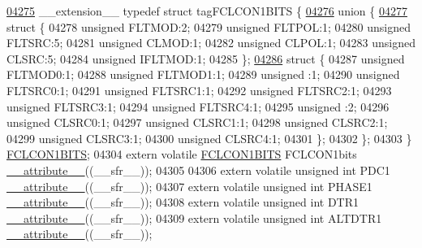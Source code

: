 \begin{DoxyCode}
\hypertarget{a00015_source_l04275}{}\hyperlink{a00014}{04275} \_\_extension\_\_ \textcolor{keyword}{typedef} \textcolor{keyword}{struct }tagFCLCON1BITS \{
\hypertarget{a00015_source_l04276}{}\hyperlink{a00015}{04276}   \textcolor{keyword}{union }\{
\hypertarget{a00015_source_l04277}{}\hyperlink{a00015}{04277}     \textcolor{keyword}{struct }\{
04278       \textcolor{keywordtype}{unsigned} FLTMOD:2;
04279       \textcolor{keywordtype}{unsigned} FLTPOL:1;
04280       \textcolor{keywordtype}{unsigned} FLTSRC:5;
04281       \textcolor{keywordtype}{unsigned} CLMOD:1;
04282       \textcolor{keywordtype}{unsigned} CLPOL:1;
04283       \textcolor{keywordtype}{unsigned} CLSRC:5;
04284       \textcolor{keywordtype}{unsigned} IFLTMOD:1;
04285     \};
\hypertarget{a00015_source_l04286}{}\hyperlink{a00015}{04286}     \textcolor{keyword}{struct }\{
04287       \textcolor{keywordtype}{unsigned} FLTMOD0:1;
04288       \textcolor{keywordtype}{unsigned} FLTMOD1:1;
04289       \textcolor{keywordtype}{unsigned} :1;
04290       \textcolor{keywordtype}{unsigned} FLTSRC0:1;
04291       \textcolor{keywordtype}{unsigned} FLTSRC1:1;
04292       \textcolor{keywordtype}{unsigned} FLTSRC2:1;
04293       \textcolor{keywordtype}{unsigned} FLTSRC3:1;
04294       \textcolor{keywordtype}{unsigned} FLTSRC4:1;
04295       \textcolor{keywordtype}{unsigned} :2;
04296       \textcolor{keywordtype}{unsigned} CLSRC0:1;
04297       \textcolor{keywordtype}{unsigned} CLSRC1:1;
04298       \textcolor{keywordtype}{unsigned} CLSRC2:1;
04299       \textcolor{keywordtype}{unsigned} CLSRC3:1;
04300       \textcolor{keywordtype}{unsigned} CLSRC4:1;
04301     \};
04302   \};
04303 \} \hyperlink{a00014_d0/dc4/a00443}{FCLCON1BITS};
04304 \textcolor{keyword}{extern} \textcolor{keyword}{volatile} \hyperlink{a00014_d0/dc4/a00443}{FCLCON1BITS} FCLCON1bits \hyperlink{a00015_a493c46f03454991ccc5aa7a6e1dfb2a7}{\_\_attribute\_\_}((\_\_sfr\_\_));
04305 
04306 \textcolor{keyword}{extern} \textcolor{keyword}{volatile} \textcolor{keywordtype}{unsigned} \textcolor{keywordtype}{int}  PDC1 \hyperlink{a00015_a493c46f03454991ccc5aa7a6e1dfb2a7}{\_\_attribute\_\_}((\_\_sfr\_\_));
04307 \textcolor{keyword}{extern} \textcolor{keyword}{volatile} \textcolor{keywordtype}{unsigned} \textcolor{keywordtype}{int}  PHASE1 \hyperlink{a00015_a493c46f03454991ccc5aa7a6e1dfb2a7}{\_\_attribute\_\_}((\_\_sfr\_\_));
04308 \textcolor{keyword}{extern} \textcolor{keyword}{volatile} \textcolor{keywordtype}{unsigned} \textcolor{keywordtype}{int}  DTR1 \hyperlink{a00015_a493c46f03454991ccc5aa7a6e1dfb2a7}{\_\_attribute\_\_}((\_\_sfr\_\_));
04309 \textcolor{keyword}{extern} \textcolor{keyword}{volatile} \textcolor{keywordtype}{unsigned} \textcolor{keywordtype}{int}  ALTDTR1 \hyperlink{a00015_a493c46f03454991ccc5aa7a6e1dfb2a7}{\_\_attribute\_\_}((\_\_sfr\_\_));

\end{DoxyCode}
